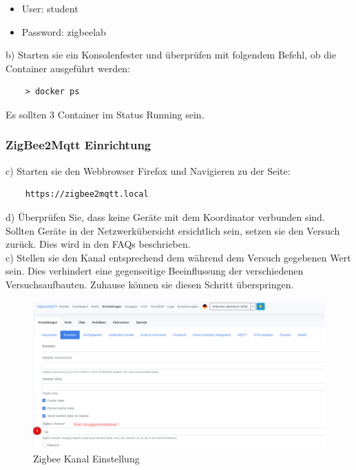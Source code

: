 \begin{itemize}
    \item User: student 
    \item Password: zigbeelab
\end{itemize}

b) Starten sie ein Konsolenfester und überprüfen mit folgendem Befehl, ob die Container ausgeführt werden:
\begin{lstlisting}
    > docker ps
\end{lstlisting}

Es sollten 3 Container im Status \grqq Running\grqq{} sein. 

\subsubsection{ZigBee2Mqtt Einrichtung}

c) Starten sie den Webbrowser Firefox und Navigieren zu der Seite:
\begin{lstlisting}
    https://zigbee2mqtt.local
\end{lstlisting}

d) Überprüfen Sie, dass keine Geräte mit dem Koordinator verbunden sind. Sollten Geräte in der Netzwerkübersicht ersichtlich sein, setzen sie den Versuch zurück.
Dies wird in den FAQs beschrieben.\\

c) Stellen sie den Kanal entsprechend dem während dem Versuch gegebenen Wert sein.
Dies verhindert eine gegenseitige Beeinflussung der verschiedenen Versuchsaufbauten. Zuhause können sie diesen Schritt überspringen.

\begin{figure}[H]
    \centering
    \includegraphics[width=1\textwidth]{media/Z2M-Channel.png}
    \caption{Zigbee Kanal Einstellung}
\end{figure}

